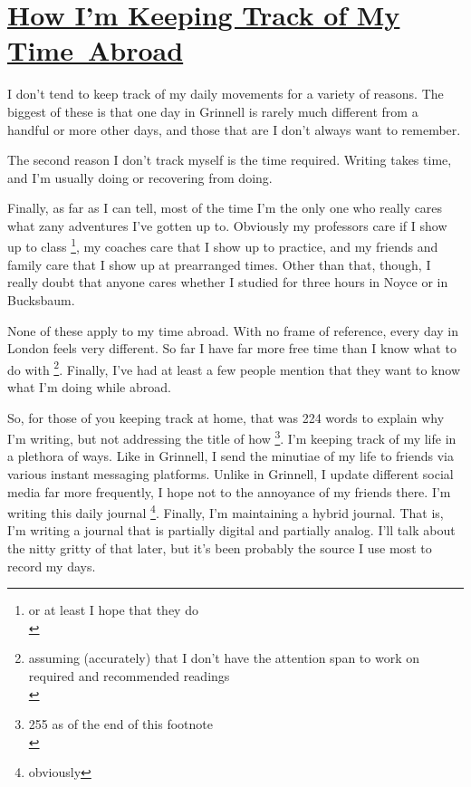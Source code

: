 \hypertarget{how-im-keeping-track-of-my-time-abroad}{%
\section{\href{how-im-keeping-track-of-my-time-abroad.html}{How I'm Keeping Track of My
Time~Abroad}}\label{how-im-keeping-track-of-my-timeabroad}}

I don't tend to keep track of my daily movements for a variety of
reasons. The biggest of these is that one day in Grinnell is rarely much
different from a handful or more other days, and those that are I don't
always want to remember.

The second reason I don't track myself is the time required. Writing
takes time, and I'm usually doing or recovering from doing.

Finally, as far as I can tell, most of the time I'm the only one who
really cares what zany adventures I've gotten up to. Obviously my
professors care if I show up to class \footnote{or at least I hope that
  they do\\}, my coaches care that I show up to practice, and my friends
and family care that I show up at prearranged times. Other than that,
though, I really doubt that anyone cares whether I studied for three
hours in Noyce or in Bucksbaum.

None of these apply to my time abroad. With no frame of reference, every
day in London feels very different. So far I have far more free time
than I know what to do with \footnote{assuming (accurately) that I don't
  have the attention span to work on required and recommended readings\\}.
Finally, I've had at least a few people mention that they want to know
what I'm doing while abroad.

So, for those of you keeping track at home, that was 224 words to
explain why I'm writing, but not addressing the title of how \footnote{255
  as of the end of this footnote\\}. I'm keeping track of my life in a
plethora of ways. Like in Grinnell, I send the minutiae of my life to
friends via various instant messaging platforms. Unlike in Grinnell, I
update different social media far more frequently, I hope not to the
annoyance of my friends there. I'm writing this daily journal \footnote{obviously}.
Finally, I'm maintaining a hybrid journal. That is, I'm writing a
journal that is partially digital and partially analog. I'll talk about
the nitty gritty of that later, but it's been probably the source I use
most to record my days.
